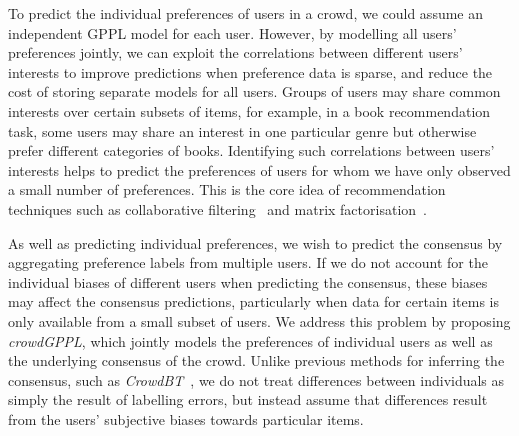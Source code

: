 To predict the individual preferences of users in a crowd,
we could assume an independent GPPL model for each user.
However, by modelling all users' preferences jointly, we can
exploit the correlations between different users' interests
to improve predictions when preference data is sparse,
and reduce the cost of storing separate models for all users.
Groups of users may share common interests over certain subsets of items,
for example, in a book recommendation task,
some users may share an interest in one particular genre 
but otherwise prefer different categories of books.
Identifying such correlations between users' interests helps to predict 
the preferences of users for whom we have only observed a small number of preferences.
This is the core idea of recommendation techniques such as collaborative filtering~\citep{resnick1997recommender} and matrix factorisation~\citep{koren2009matrix}.

As well as predicting individual preferences, 
we wish to predict the consensus by aggregating
preference labels from multiple users. 
If we do not account for the individual biases of different users
when predicting the consensus,
these biases may affect the consensus predictions,
particularly when data for certain items is only available from a small subset of users.
We address this problem by proposing \emph{crowdGPPL}, which jointly models 
the preferences of individual users as well as the underlying consensus of the crowd.
Unlike previous methods for inferring the consensus, 
such as \emph{CrowdBT}~\citep{chen2013pairwise}, we do not treat differences between individuals as simply the result of labelling errors, 
but instead assume that differences result from the users' subjective biases
towards particular items. 
 

